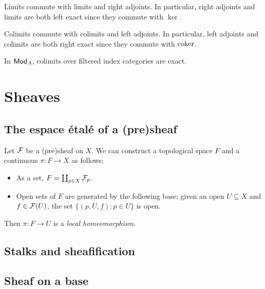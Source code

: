 \documentclass[11pt]{amsart}
\begin{document}
\begin{prop}
Limits commute with limits and right adjoints. In particular, right adjoints and limits are both left exact since they commute with $\ker$.

Colimits commute with colimits and left adjoints. In particular, left adjoints and colimits are both right exact since they commute with $\operatorname{coker}$.

In $\mathsf{Mod}_A$, colimits over filtered index categories are exact.
\end{prop}



\section{Sheaves}

\subsection{The espace \'etal\'e of a (pre)sheaf}

Let $\mathcal{F}$ be a (pre)sheaf on $X$. We can construct a topological space $F$ and a continuous $\pi: F\to X$ as follows:
\begin{itemize}
    \item As a set, $F = \coprod_{p\in X} \mathcal{F}_p$.
    \item Open sets of $F$ are generated by the following base: given an open $U\subseteq X$ and $f\in \mathcal{F}(U)$, the set $\{(p, U, f): p\in U\}$ is open.
\end{itemize}
Then $\pi: F\to U$ is a \emph{local homeomorphism}.

\subsection{Stalks and sheafification}


\subsection{Sheaf on a base} 
\end{document}
